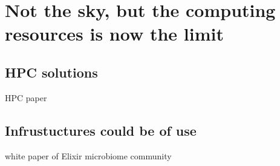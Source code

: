 \chapter{Not the sky, but the computing resources is now the limit}
\label{cha:6}


\section{HPC solutions}

HPC paper


\section{Infrustuctures could be of use}

white paper of Elixir microbiome community 

